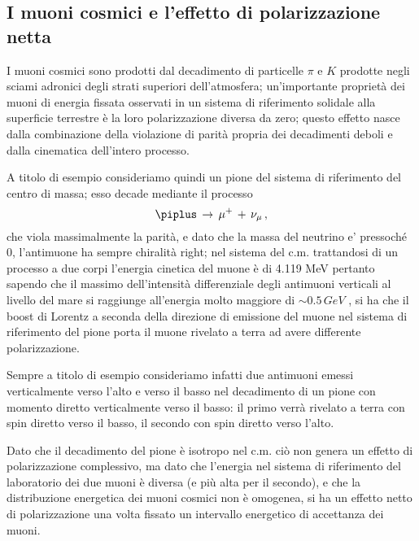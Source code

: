 \subsection{I muoni cosmici e l'effetto di polarizzazione netta}
I muoni cosmici sono prodotti dal decadimento di particelle $\pi$ e $K$ prodotte negli sciami adronici degli strati superiori dell'atmosfera; un'importante proprietà dei muoni di energia fissata osservati in un sistema di riferimento solidale alla superficie terrestre è la loro polarizzazione diversa da zero; questo effetto nasce dalla combinazione della violazione di parità propria dei decadimenti deboli e dalla cinematica dell'intero processo. \par
A titolo di esempio consideriamo quindi un pione del sistema di riferimento del centro di massa; esso decade mediante il processo
\begin{equation}
	\piplus \, \to \, \mu^+ \, + \, \nu_{\mu} \, ,
	\label{eq:pi_decay}
\end{equation}
che viola massimalmente la parità, e dato che la massa del neutrino e' pressoch\'e 0, l'antimuone ha sempre chiralità right; nel sistema del c.m. trattandosi di un processo a due corpi l'energia cinetica del muone è di 4.119 MeV  pertanto sapendo che il massimo dell'intensità differenziale degli antimuoni verticali al livello del mare si raggiunge all'energia molto maggiore di $\sim 0.5 \, GeV$  \cite{bib:AJP-Amsler}, si ha che il boost di Lorentz a seconda della direzione di emissione del muone nel sistema di riferimento del pione porta il muone rivelato a terra ad avere differente polarizzazione. \par
Sempre a titolo di esempio consideriamo infatti due antimuoni emessi verticalmente verso l'alto e verso il basso nel decadimento di un pione con momento diretto verticalmente verso il basso:
il primo verrà rivelato a terra con spin diretto verso il basso, il secondo con spin diretto verso l'alto. \par
Dato che il decadimento del pione è isotropo nel c.m. ciò non genera un effetto di polarizzazione complessivo, ma dato che l'energia nel sistema di riferimento del laboratorio dei due muoni è diversa (e più alta per il secondo), e che la distribuzione energetica dei muoni cosmici non è omogenea, si ha un effetto netto di polarizzazione una volta fissato un intervallo energetico di accettanza dei muoni. \cite{bib:Lipari:1993hd} \par

 \par

